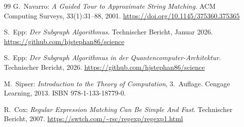 ﻿\documentclass[a4paper,12pt]{article}
\theoremstyle{definition}
\begin{document}
\begin{thebibliography}{99}
G.~Navarro:
\textit{A Guided Tour to Approximate String Matching}.
ACM Computing Surveys, 33(1):31--88, 2001.
\url{https://doi.org/10.1145/375360.375365}

S.~Epp:
\textit{Der Subgraph Algorithmus}.
Technischer Bericht, Januar 2026.
\url{https://github.com/hjstephan86/science}

S.~Epp:
\textit{Der Subgraph Algorithmus in der Quantencomputer-Architektur}.
Technischer Bericht, 2026.
\url{https://github.com/hjstephan86/science}

M.~Sipser:
\textit{Introduction to the Theory of Computation}, 3.~Auflage.
Cengage Learning, 2013.
ISBN 978-1-133-18779-0.

R.~Cox:
\textit{Regular Expression Matching Can Be Simple And Fast}.
Technischer Bericht, 2007.
\url{https://swtch.com/~rsc/regexp/regexp1.html}

\end{thebibliography}
\end{document}

